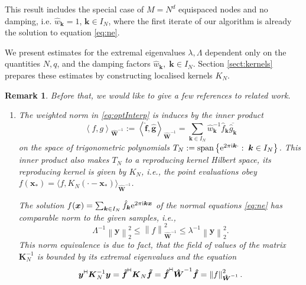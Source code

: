 \documentclass[11pt,a4paper,bibtotoc]{scrartcl}
\def\ti{\mbox{\scriptsize{\rm i}}}
\newcommand{\eip}[1]{{\rm e}^{ 2\pi{\ti} #1}}
\newcommand{\zb}[1]{\ensuremath{\boldsymbol{#1}}}
\newcommand{\adj}{{\vdash \hspace*{-1.72mm} \dashv}}
\renewcommand{\span}{{\rm span}}
\newcommand{\indexset}{{I_N}}
\newtheorem{remark}[theorem]{Remark}
\newenvironment{Remark}{\goodbreak \begin{remark}\rm}{\end{remark}}
\numberwithin{equation}{section}
\numberwithin{table}{section}
\numberwithin{figure}{section}
\begin{document}
This result includes the special case of $M=N^d$ equispaced nodes and no
damping, i.e. $\hat w_{\zb k}=1$, $\zb k \in I_N$, where the first iterate of our
algorithm is already the solution to equation \eqref{eq:ne}.

We present estimates for the extremal eigenvalues $\lambda,\Lambda$ dependent
only on the quantities $N,q$, and the damping factors $\hat w_{\zb k},\; \zb k
\in \indexset$.
Section \ref{sect:kernels} prepares these estimates by constructing localised
kernels $K_N$.

\begin{Remark}\label{remark:ref}
Before that, we would like to give a few references to related work.
\begin{enumerate}
\item The weighted norm in \eqref{eq:optInterp} is induces by the inner
  product
  \begin{equation*}
    \left\langle f,g\right\rangle_{\zb {\hat W}^{-1}}:=\left\langle \zb {\hat
        f}, \zb {\hat g}\right\rangle_{\zb {\hat W}^{-1}}=\sum\limits_{\zb
        k\in I_N} \hat w_{\zb k}^{-1} \hat f_{\zb k} \overline{\hat g_{\zb k}}
  \end{equation*}
  on the space of trigonometric polynomials $T_N:=\span\left\{\eip{\zb k
      \cdot}:\;\zb k \in \indexset\right\}$.
  This inner product also makes $T_N$ to a reproducing kernel Hilbert space,
  its reproducing kernel is given by $K_N$, i.e., the point evaluations
  obey $f(\zb x_*) = \langle f,K_N(\cdot - \zb x_*)\rangle_{\zb {\hat
      W}^{-1}}$.

  The solution $f(\zb x)=\sum_{\zb k \in \indexset} \hat f_{\zb k} \eip{\zb k
  \zb x}$ of the normal equations \eqref{eq:ne} has comparable norm to the
  given samples, i.e.,
  \begin{equation*}
    \Lambda^{-1}\left\|\zb y\right\|_2^2 \le \left\|f\right\|_{\zb {\hat
    W}^{-1}}^2 \le \lambda^{-1}\left\|\zb y\right\|_2^2.
  \end{equation*}
  This norm equivalence is due to fact, that the field of values of the matrix
  $\zb K_N^{-1}$ is bounded by its extremal eigenvalues and the equation
  \begin{equation*}
    \zb y^{\adj} \zb K_N^{-1} \zb y
    = \zb {\tilde f}^{\adj} \zb K_N \zb {\tilde f}
    = \zb{\hat f}^{\adj} \zb {\hat W}^{-1} \zb{\hat f}
    = \left\|f\right\|_{\zb {\hat W}^{-1}}^2. 
  \end{equation*}


\end{enumerate}
\end{Remark}
\end{document}

